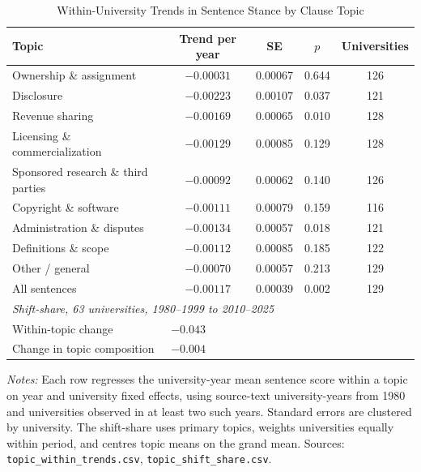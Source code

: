 \begin{table}[htbp]
\centering
\caption{Within-University Trends in Sentence Stance by Clause Topic}
\label{tab:topic-trends}
\begin{tabular}{lcccc}
\hline
Topic & Trend per year & SE & $p$ & Universities \\
\hline
Ownership \& assignment & $-0.00031$ & 0.00067 & 0.644 & 126 \\
Disclosure & $-0.00223$ & 0.00107 & 0.037 & 121 \\
Revenue sharing & $-0.00169$ & 0.00065 & 0.010 & 128 \\
Licensing \& commercialization & $-0.00129$ & 0.00085 & 0.129 & 128 \\
Sponsored research \& third parties & $-0.00092$ & 0.00062 & 0.140 & 126 \\
Copyright \& software & $-0.00111$ & 0.00079 & 0.159 & 116 \\
Administration \& disputes & $-0.00134$ & 0.00057 & 0.018 & 121 \\
Definitions \& scope & $-0.00112$ & 0.00085 & 0.185 & 122 \\
Other / general & $-0.00070$ & 0.00057 & 0.213 & 129 \\
All sentences & $-0.00117$ & 0.00039 & 0.002 & 129 \\
\hline
\multicolumn{5}{l}{\textit{Shift-share, 63 universities, 1980--1999 to 2010--2025}} \\
Within-topic change & \multicolumn{4}{l}{$-0.043$} \\
Change in topic composition & \multicolumn{4}{l}{$-0.004$} \\
\hline
\end{tabular}
\begin{minipage}{0.95\textwidth}\footnotesize
\vspace{4pt}
\textit{Notes:} Each row regresses the university-year mean sentence score within a topic on year and university fixed effects, using source-text university-years from 1980 and universities observed in at least two such years. Standard errors are clustered by university. The shift-share uses primary topics, weights universities equally within period, and centres topic means on the grand mean. Sources: \texttt{topic\_within\_trends.csv}, \texttt{topic\_shift\_share.csv}.
\end{minipage}
\end{table}

